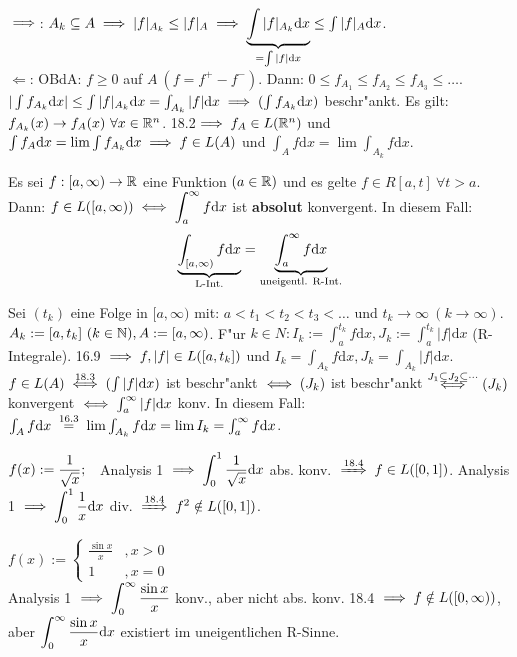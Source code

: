 \documentclass[a4paper,twoside,DIV15,BCOR12mm]{scrbook}
\begin{document}
\begin{beweis}
\glqq$\implies$\grqq: $A_k\subseteq A\implies |f|_{A_k}\le |f|_{A}\implies\underbrace{\int|f|_{A_k}\text{d}x}_{=\int|f|\text{d}x}\le\int|f|_A\text{d}x$.\\
\glqq$\Leftarrow$\grqq: OBdA: $f\ge 0$ auf $A\ (f=f^{+}-f^{-})$. Dann: $0\le f_{A_1}\le f_{A_2}\le f_{A_3}\le \ldots$. $|\int f_{A_k}\text{d}x|\le\int|f|_{A_k}\text{d}x=\int_{A_k}|f|\text{d}x\implies (\int f_{A_k}\text{d}x)$ beschr"ankt. Es gilt: $f_{A_k}(x)\to f_A(x)\ \forall x\in\mathbb{R}^n$. 18.2$\implies f_A\in L(\mathbb{R}^n)$ und $\int f_A\text{d}x=\lim\int f_{A_k}\text{d}x\implies f\in L(A)$ und $\int_A f\text{d}x=\lim\int_{A_k}f\text{d}x$. 
\end{beweis}

\begin{satz}
Es sei $f:[a,\infty)\to\mathbb{R}$ eine Funktion $(a\in\mathbb{R})$ und es gelte $f\in R[a,t]\ \forall t>a$. Dann: $f\in L([a,\infty))\iff \displaystyle\int_a^\infty f\text{d}x$ ist \textbf{absolut} konvergent. In diesem Fall:
$$\underbrace{\displaystyle\int_{[a,\infty)}f\text{d}x}_{\text{L-Int.}}=\underbrace{\displaystyle\int_a^\infty f\text{d}x}_{\text{uneigentl. R-Int.}}$$
\end{satz}

\begin{beweis}
Sei $(t_k)$ eine Folge in $[a,\infty)$ mit: $a<t_1<t_2<t_3<\ldots$ und $t_k\to\infty\ (k\to\infty)$. $A_k:=[a,t_k]\ (k\in\mathbb{N}), A:=[a,\infty)$. F"ur $k\in N: I_k:=\int_a^{t_k}f\text{d}x, J_k:=\int_a^{t_k}|f|\text{d}x$ (R-Integrale). 16.9 $\implies f, |f|\in L([a,t_k])$ und $I_k=\int_{A_k}f\text{d}x, J_k=\int_{A_k}|f|\text{d}x$. $f\in L(A)\overset{18.3}{\iff}(\int|f|\text{d}x)$ ist beschr"ankt $\iff (J_k)$ ist beschr"ankt $\overset{J_1\subseteq J_2\subseteq \cdots}{\iff}(J_k)$ konvergent $\iff\int_a^\infty|f|\text{d}x$ konv. In diesem Fall: $\int_A f\text{d}x\gleichnach{16.3}\lim\int_{A_k}f\text{d}x=\lim I_k=\int_a^\infty f\text{d}x$. 
\end{beweis}

\begin{beispiele}
\item $f(x):=\displaystyle\frac{1}{\sqrt{x}};\quad$Analysis 1 $\implies \displaystyle\int_0^1\displaystyle\frac{1}{\sqrt{x}}\text{d}x$ abs. konv. $\folgtnach{18.4}f\in L([0,1])$. Analysis 1 $\implies \displaystyle\int_0^1\displaystyle\frac{1}{x}\text{d}x$ div. $\folgtnach{18.4}f^2\notin L([0,1])$.
\item $f(x):=\begin{cases}
\frac{\sin x}{x} &, x>0\\
1 &, x=0
\end{cases}$\\
Analysis 1 $\implies\displaystyle\int_0^\infty\displaystyle\frac{\sin x}{x}$ konv., aber nicht abs. konv. 18.4 $\implies f\notin L([0,\infty))$, aber $\displaystyle\int_0^\infty\displaystyle\frac{\sin x}{x}\text{d}x$ existiert im uneigentlichen R-Sinne.
\end{beispiele}
\end{document}
